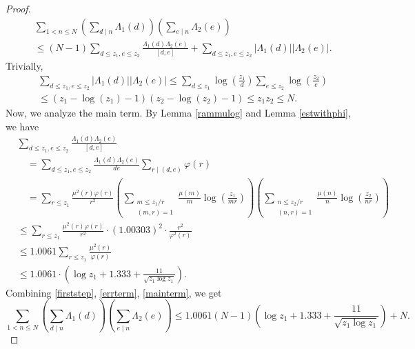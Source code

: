 \documentclass[reqno]{amsart}
\numberwithin{equation}{section}
\theoremstyle{remark}
\begin{document}
\begin{proof}
    \begin{equation}\label{firststep}
\begin{aligned}
&\sum_{1<n \leq  N}\left(\sum_{d \mid n} \Lambda_1(d)\right)\left(\sum_{e \mid n} \Lambda_2(e)\right)\\
&\le (N-1) \sum_{d\le z_1, e\le z_2} \frac{\Lambda_1(d) \Lambda_2(e)}{[d, e]}+\sum_{d\le z_1, e\le z_2}\left|\Lambda_1(d)\right|\left|\Lambda_2(e)\right|.
\end{aligned}
\end{equation}
Trivially,
\begin{equation}\label{errterm}
\begin{aligned}
    &\sum_{d\le z_1, e\le z_2}\left|\Lambda_1(d)\right|\left|\Lambda_2(e)\right|\le \sum_{d \leq  z_1} \log \left(\frac{z_1}{d}\right) \sum_{e \leq  z_2} \log \left(\frac{z_2}{e}\right)\\& \le( z_1-\log(z_1)-1)( z_2-\log(z_2)-1)\le z_1z_2\le N.
\end{aligned}
\end{equation}
Now, we analyze the main term. By Lemma \ref{rammulog} and Lemma \ref{estwithphi}, we have
\begin{equation}\label{mainterm}
\begin{aligned}
&\sum_{d\le z_1, e\le z_2} \frac{\Lambda_1(d) \Lambda_2(e)}{[d, e]} \\&
\quad=\sum_{d\le z_1, e\le z_2} \frac{\Lambda_1(d) \Lambda_2(e)}{d e} \sum_{r \mid(d, e)} \varphi(r) \\&
\quad=\sum_{r \leq  z_1} \frac{\mu^2(r) \varphi(r)}{r^2}\left(\sum_{\substack{m \leq  z_1 / r \\
(m, r)=1}} \frac{\mu(m)}{m} \log \left(\frac{z_1}{m r}\right)\right)\left(\sum_{\substack{n \leq  z_2 / r \\
(n, r)=1}} \frac{\mu(n)}{n} \log \left(\frac{z_2}{n r}\right)\right)\\&\le \sum_{r \leq  z_1} \frac{\mu^2(r) \varphi(r)}{r^2} \cdot (1.00303)^2\cdot \frac{r^2}{\varphi^2(r)}\\&\le 1.0061 \sum_{r \leq  z_1} \frac{\mu^2(r)}{ \varphi(r)}\\&\le 1.0061\cdot \left(\log z_1+1.333+\frac{11}{\sqrt{z_1\log z_1}}\right).
\end{aligned}
\end{equation}
Combining \eqref{firststep}, \eqref{errterm}, \eqref{mainterm}, we get
\begin{equation*}
    \sum_{1<n \leq  N}\left(\sum_{d \mid n} \Lambda_1(d)\right)\left(\sum_{e \mid n} \Lambda_2(e)\right)\le 1.0061(N-1)  \left(\log z_1+1.333+\frac{11}{\sqrt{z_1\log z_1}}\right)+N.
\end{equation*}
\end{proof}
\end{document}
